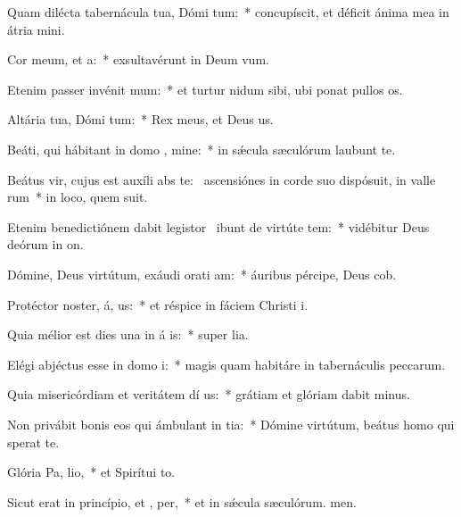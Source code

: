 \item Quam dilécta tabernácula tua, Dómi tum:~* concupíscit, et déficit ánima mea in átria mini.
\item Cor meum, et  a:~* exsultavérunt in Deum vum.
\item Etenim passer invénit  mum:~* et turtur nidum sibi, ubi ponat pullos os.
\item Altária tua, Dómi tum:~* Rex meus, et Deus us.
\item Beáti, qui hábitant in domo , mine:~* in sǽcula sæculórum laubunt te.
\item Beátus vir, cujus est auxíli abs te:~\pscross{} ascensiónes in corde suo dispósuit, in valle rum~* in loco, quem suit.
\item Etenim benedictiónem dabit legistor~\pscross{} ibunt de virtúte  tem:~* vidébitur Deus deórum in on.
\item Dómine, Deus virtútum, exáudi orati am:~* áuribus pércipe, Deus cob.
\item Protéctor noster, á, us:~* et réspice in fáciem Christi i.
\item Quia mélior est dies una in á is:~* super lia.
\item Elégi abjéctus esse in domo  i:~* magis quam habitáre in tabernáculis peccarum.
\item Quia misericórdiam et veritátem dí us:~* grátiam et glóriam dabit minus.
\item Non privábit bonis eos qui ámbulant in tia:~* Dómine virtútum, beátus homo qui sperat  te.
\item Glória Pa,  lio,~* et Spirítui to.
\item Sicut erat in princípio, et ,  per,~* et in sǽcula sæculórum. men.
